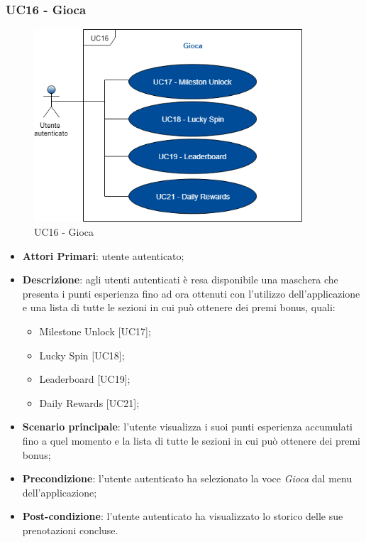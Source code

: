 \subsubsection{UC16 - Gioca}
 \begin{figure}[h]
	\includegraphics[width=10cm]{res/images/UC19Gioca.png}
	\centering
	\caption{UC16 - Gioca}
\end{figure}
\begin{itemize}
	\item \textbf{Attori Primari}: utente autenticato;
	\item \textbf{Descrizione}: agli utenti autenticati è resa disponibile una maschera che presenta i punti esperienza fino ad ora ottenuti con l'utilizzo dell'applicazione e una lista di tutte le sezioni in cui può ottenere dei premi bonus, quali:
	\begin{itemize}
		\item Milestone Unlock [UC17];
		\item Lucky Spin [UC18];
		\item Leaderboard [UC19];
		\item Daily Rewards [UC21];
	\end{itemize} 
	\item \textbf{Scenario principale}: l'utente visualizza i suoi punti esperienza accumulati fino a quel momento e la lista di tutte le sezioni in cui può ottenere dei premi bonus;
	\item \textbf{Precondizione}: l'utente autenticato ha selezionato la voce \textit{Gioca} dal menu dell'applicazione;
	\item \textbf{Post-condizione}: l'utente autenticato ha visualizzato lo storico delle sue prenotazioni concluse. 
\end{itemize} 
